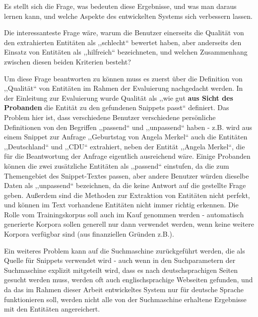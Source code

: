 Es stellt sich die Frage, was bedeuten diese Ergebnisse, und was man daraus lernen kann, und welche Aspekte des entwickelten Systems sich verbessern lassen.

Die interessanteste Frage wäre, warum die Benutzer einerseits die Qualität von den extrahierten Entitäten als ,,schlecht`` bewertet haben, aber anderseits den Einsatz von Entitäten als ,,hilfreich`` bezeichneten, und welchen Zusammenhang zwischen diesen beiden Kriterien besteht? 

Um diese Frage beantworten zu können muss es zuerst über die Definition von ,,Qualität`` von Entitäten im Rahmen der Evaluierung nachgedacht werden. In der Einleitung zur Evaluierung wurde Qualität als ,,wie gut \textbf{aus Sicht des Probanden} die Entität zu den gefundenen Snippets passt`` definiert. Das Problem hier ist, dass verschiedene Benutzer verschiedene persönliche Definitionen von den Begriffen ,,passend`` und ,,unpassend`` haben - z.B. wird aus einem Snippet zur Anfrage ,,Geburtstag von Angela Merkel`` auch die Entitäten ,,Deutschland`` und ,,CDU`` extrahiert, neben der Entität ,,Angela Merkel``, die für die Beantwortung der Anfrage eigentlich ausreichend wäre. Einige Probanden können die zwei zusätzliche Entitäten als ,,passend`` einstufen, da die zum Themengebiet des Snippet-Textes passen, aber andere Benutzer würden dieselbe Daten als ,,unpassend`` bezeichnen, da die keine Antwort auf die gestellte Frage geben. Außerdem sind die Methoden zur Extraktion von Entitäten nicht perfekt, und können im Text vorhandene Entitäten nicht immer richtig erkennen. Die Rolle vom Trainingskorpus soll auch im Kauf genommen werden - automatisch generierte Korpora sollen generell nur dann verwendet werden, wenn keine weitere Korpora verfügbar sind (aus finanziellen Gründen z.B.).

Ein weiteres Problem kann auf die Suchmaschine zurückgeführt werden, die als Quelle für Snippets verwendet wird - auch wenn in den Suchparametern der Suchmaschine explizit mitgeteilt wird, dass es nach deutschsprachigen Seiten gesucht werden muss, werden oft auch englischsprachige Webseiten gefunden, und da das im Rahmen dieser Arbeit entwickeltes System nur für deutsche Sprache funktionieren soll, werden nicht alle von der Suchmaschine erhaltene Ergebnisse mit den Entitäten angereichert.

